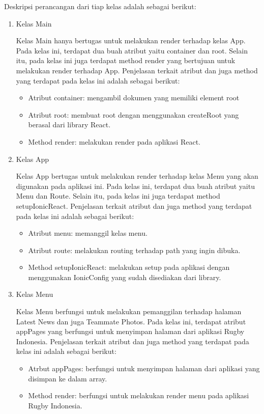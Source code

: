 Deskripsi perancangan dari tiap kelas adalah sebagai berikut:
\begin{enumerate}
    \item Kelas Main
    
    Kelas Main hanya bertugas untuk melakukan render terhadap kelas App. Pada kelas ini, terdapat dua buah atribut yaitu container dan root. Selain itu, pada kelas ini juga terdapat method render yang bertujuan untuk melakukan render terhadap App. Penjelasan terkait atribut dan juga method yang terdapat pada kelas ini adalah sebagai berikut:
    \begin{itemize}
        \item Atribut container: mengambil dokumen yang memiliki element root
        \item Atribut root: membuat root dengan menggunakan createRoot yang berasal dari library React.
        \item Method render: melakukan render pada aplikasi React.
    \end{itemize}

    \item Kelas App

    Kelas App bertugas untuk melakukan render terhadap kelas Menu yang akan digunakan pada aplikasi ini. Pada kelas ini, terdapat dua buah atribut yaitu Menu dan Route. Selain itu, pada kelas ini juga terdapat method setupIonicReact. Penjelasan terkait atribut dan juga method yang terdapat pada kelas ini adalah sebagai berikut:
    \begin{itemize}
        \item Atribut menu: memanggil kelas menu.
        \item Atribut route: melakukan routing terhadap path yang ingin dibuka.
        \item Method setupIonicReact: melakukan setup pada aplikasi dengan menggunakan IonicConfig yang sudah disediakan dari library.
    \end{itemize}

    \item Kelas Menu

    Kelas Menu berfungsi untuk melakukan pemanggilan terhadap halaman Latest News dan juga Teammate Photos. Pada kelas ini, terdapat atribut appPages yang berfungsi untuk menyimpan halaman dari aplikasi Rugby Indonesia. Penjelasan terkait atribut dan juga method yang terdapat pada kelas ini adalah sebagai berikut:
    \begin{itemize}
        \item Atrbut appPages: berfungsi untuk menyimpan halaman dari aplikasi yang disimpan ke dalam array.
        \item Method render: berfungsi untuk melakukan render menu pada aplikasi Rugby Indonesia.
    \end{itemize}


\end{enumerate}
